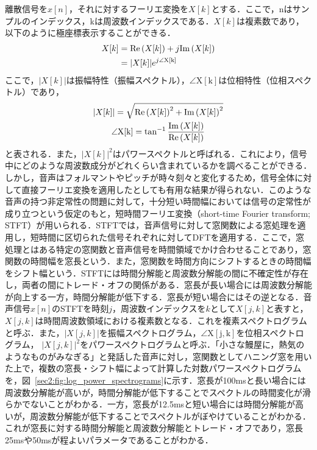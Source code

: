 \documentclass[12pt]{jarticle}
\numberwithin{equation}{section}    %
\numberwithin{figure}{section}      %
\numberwithin{table}{section}      %
\begin{document}
離散信号を$x[n]$，それに対するフーリエ変換を$X[k]$とする．ここで，nはサンプルのインデックス，kは周波数インデックスである．$X[k]$は複素数であり，以下のように極座標表示することができる．
\begin{align}
    X[k] & = \mathrm{Re}\left(X[k]\right) + j\mathrm{Im}\left(X[k]\right) \\
         & = |X[k]|e^{j\angle\mathrm{X[k]}}
\end{align}
ここで，$|X[k]|$は振幅特性（振幅スペクトル），$\angle\mathrm{X[k]}$は位相特性（位相スペクトル）であり，
\begin{gather}
    |X[k]| = \sqrt{\mathrm{Re}\left(X[k]\right)^{2} + \mathrm{Im}\left(X[k]\right)^{2}} \\
    \angle\mathrm{X[k]} = \tan^{-1} \frac{\mathrm{Im}\left(X[k]\right)}{\mathrm{Re}\left(X[k]\right)}
\end{gather}
と表される．また，$|X[k]|^2$はパワースペクトルと呼ばれる．これにより，信号中にどのような周波数成分がどれくらい含まれているかを調べることができる．しかし，音声はフォルマントやピッチが時々刻々と変化するため，信号全体に対して直接フーリエ変換を適用したとしても有用な結果が得られない．このような音声の持つ非定常性の問題に対して，十分短い時間幅においては信号の定常性が成り立つという仮定のもと，短時間フーリエ変換（short-time Fourier transform; STFT）が用いられる．STFTでは，音声信号に対して窓関数による窓処理を適用し，短時間に区切られた信号それぞれに対してDFTを適用する．ここで，窓処理とはある特定の窓関数と音声信号を時間領域でかけ合わせることであり，窓関数の時間幅を窓長という．また，窓関数を時間方向にシフトするときの時間幅をシフト幅という．STFTには時間分解能と周波数分解能の間に不確定性が存在し，両者の間にトレード・オフの関係がある．窓長が長い場合には周波数分解能が向上する一方，時間分解能が低下する．窓長が短い場合にはその逆となる．音声信号$x[n]$のSTFTを時刻$j$，周波数インデックスを$k$として$X[j, k]$と表すと，$X[j, k]$は時間周波数領域における複素数となる．これを複素スペクトログラムと呼ぶ．また，$|X[j, k]|$を振幅スペクトログラム，$\angle\mathrm{X[j, k]}$を位相スペクトログラム，
$|X[j, k]|^{2}$をパワースペクトログラムと呼ぶ．「小さな鰻屋に，熱気のようなものがみなぎる」と発話した音声に対し，窓関数としてハニング窓を用いた上で，複数の窓長・シフト幅によって計算した対数パワースペクトログラムを，図~\ref{sec2:fig:log_power_spectrograms}に示す．窓長が100msと長い場合には周波数分解能が高いが，時間分解能が低下することでスペクトルの時間変化が滑らかでないことがわかる．一方，窓長が12.5msと短い場合には時間分解能が高いが，周波数分解能が低下することでスペクトルがぼやけていることがわかる．これが窓長に対する時間分解能と周波数分解能とトレード・オフであり，窓長25msや50msが程よいパラメータであることがわかる．
\end{document}

